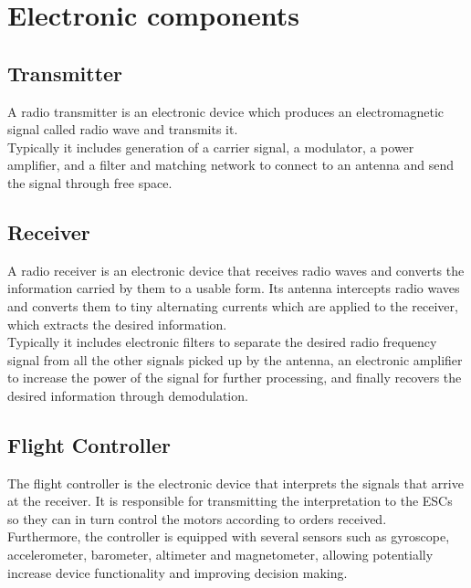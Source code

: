 \documentclass[12pt, a4paper,twoside]{tesi_upf}
\begin{document}
\chapter{Electronic components}

\section{Transmitter}

A radio transmitter is an electronic device which produces an electromagnetic signal called radio wave and transmits it. 
\\[12pt]

Typically it includes generation of a carrier signal, a modulator, a power amplifier, and a filter and matching network to connect to an antenna and send the signal through free space.

\section{Receiver}

A radio receiver is an electronic device that receives radio waves and converts the information carried by them to a usable form. Its antenna intercepts radio waves and converts them to tiny alternating currents which are applied to the receiver, which extracts the desired information.
\\[12pt]

Typically it includes electronic filters to separate the desired radio frequency signal from all the other signals picked up by the antenna, an electronic amplifier to increase the power of the signal for further processing, and finally recovers the desired information through demodulation.

\section{Flight Controller}

The flight controller is the electronic device that interprets the signals that arrive at the receiver. It is responsible for transmitting the interpretation to the ESCs so they can in turn control the motors according to orders received. 
\\[12pt]

Furthermore, the controller is equipped with several sensors such as gyroscope, accelerometer, barometer, altimeter and magnetometer, allowing potentially increase device functionality and improving decision making.
\end{document}
